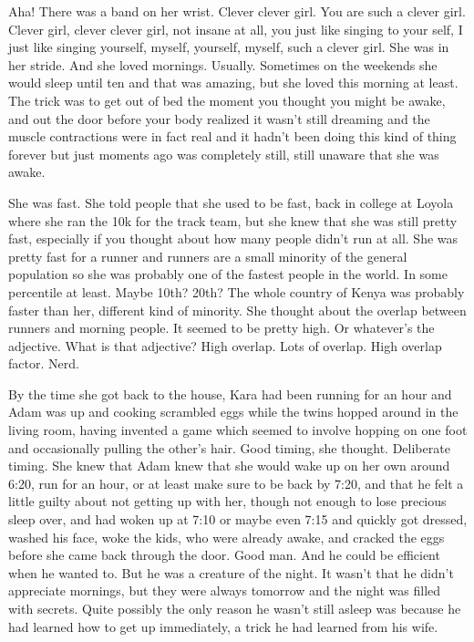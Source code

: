 Aha! There was a band on her wrist. Clever clever girl. You are such a clever girl. Clever girl, clever clever girl, not insane at all, you just like singing to your self, I just like singing yourself, myself, yourself, myself, such a clever girl. She was in her stride. And she loved mornings. Usually. Sometimes on the weekends she would sleep until ten and that was amazing, but she loved this morning at least. The trick was to get out of bed the moment you thought you might be awake, and out the door before your body realized it wasn't still dreaming and the muscle contractions were in fact real and it hadn't been doing this kind of thing forever but just moments ago was completely still, still unaware that she was awake.

She was fast. She told people that she used to be fast, back in college at Loyola where she ran the 10k for the track team, but she knew that she was still pretty fast, especially if you thought about how many people didn't run at all. She was pretty fast for a runner and runners are a small minority of the general population so she was probably one of the fastest people in the world. In some percentile at least. Maybe 10th? 20th? The whole country of Kenya was probably faster than her, different kind of minority. She thought about the overlap between runners and morning people. It seemed to be pretty high. Or whatever's the adjective. What is that adjective? High overlap. Lots of overlap. High overlap factor. Nerd.

\mypause

By the time she got back to the house, Kara had been running for an hour and Adam was up and cooking scrambled eggs while the twins hopped around in the living room, having invented a game which seemed to involve hopping on one foot and occasionally pulling the other's hair. Good timing, she thought. Deliberate timing. She knew that Adam knew that she would wake up on her own around 6:20, run for an hour, or at least make sure to be back by 7:20, and that he felt a little guilty about not getting up with her, though not enough to lose precious sleep over, and had woken up at 7:10 or maybe even 7:15 and quickly got dressed, washed his face, woke the kids, who were already awake, and cracked the eggs before she came back through the door. Good man. And he could be efficient when he wanted to. But he was a creature of the night. It wasn't that he didn't appreciate mornings, but they were always tomorrow and the night was filled with secrets. Quite possibly the only reason he wasn't still asleep was because he had learned how to get up immediately, a trick he had learned from his wife.

